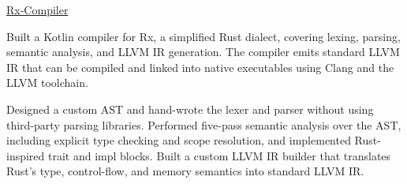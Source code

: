 
\VectraProjectEntry
    {\href{https://github.com/konpaku-ming/Rx-Compiler}{Rx-Compiler}}
    {}
    {}
    {
        \item Built a Kotlin compiler for Rx, a simplified Rust dialect, covering lexing, parsing, semantic analysis, and LLVM IR generation. The compiler emits standard LLVM IR that can be compiled and linked into native executables using Clang and the LLVM toolchain.
        \item Designed a custom AST and hand-wrote the lexer and parser without using third-party parsing libraries. Performed five-pass semantic analysis over the AST, including explicit type checking and scope resolution, and implemented Rust-inspired trait and impl blocks. Built a custom LLVM IR builder that translates Rust's type, control-flow, and memory semantics into standard LLVM IR.
    }
